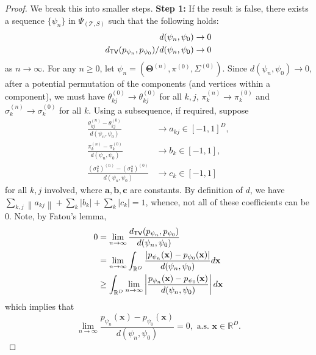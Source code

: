 \documentclass[bj,authoryear]{imsart}
\theoremstyle{plain}
\theoremstyle{remark}
\def\bTheta{{\boldsymbol\Theta}}
\def\ba{\mathbf{a}}
\def\bb{\mathbf{b}}
\def\bc{\mathbf{c}}
\def\bx{\mathbf{x}}
\def\bbR{\mathbb{R}}
\def\cT{\mathcal{T}}
\def\norm#1{\left\|#1\right\|}
\def\TV{{\sf TV}}
\def\bTheta{\boldsymbol{\Theta}}
\begin{document}
\begin{appendix}
\begin{proof}
We break this into smaller steps.
\textbf{Step 1: } If the result is false, there exists a sequence $\{\psi_n\}$ in $\Psi_{(\cT,S)}$ such that the following holds:
\begin{align}
    d(\psi_n,\psi_0)&\to 0 \\
    d_{\TV}(p_{\psi_n}, p_{\psi_0})/d(\psi_n,\psi_0) &\to 0
\end{align}
as $n\to\infty$. For any $n\geq 0$, let $\psi_n = (\bTheta^{(n)}, \pi^{(0)}, \Sigma^{(0)})$. Since $d(\psi_n,\psi_0)\to 0$, after a potential permutation of the components (and vertices within a component), we must have $\theta_{kj}^{(0)}\to\theta_{kj}^{(0)}$ for all $k,j$, $\pi_k^{(n)}\to\pi_k^{(0)}$ and $\sigma_k^{(n)}\to\sigma_k^{(0)}$ for all $k$. Using a subsequence, if required, suppose
\begin{align}
    \frac{\theta_{kj}^{(n)}-\theta_{kj}^{(0)}}{d(\psi_n,\psi_0)} &\to a_{kj} \in [-1,1]^D,\\
    \frac{\pi_{k}^{(n)}-\pi_{k}^{(0)}}{d(\psi_n,\psi_0)} &\to b_{k} \in [-1,1],\\
    \frac{(\sigma_{k}^2)^{(n)}-(\sigma_{k}^2)^{(0)}}{d(\psi_n,\psi_0)} &\to c_{k} \in [-1,1]
\end{align}
for all $k,j$ involved, where $\ba, \bb, \bc$ are constants. By definition of $d$, we have $\sum_{k,j}\norm{a_{kj}} + \sum_k |b_k| + \sum_k |c_k| = 1$, whence, not all of these coefficients can be 0. Note, by Fatou's lemma,
\begin{align*}
    0 &= \lim_{n\to \infty} \frac{d_{\TV}(p_{\psi_n},p_{\psi_0})}{d(\psi_n, \psi_0)} \\
    &= \lim_{n\to\infty} \int_{\bbR^D} \frac{\left|p_{\psi_n}(\bx) - p_{\psi_0}(\bx)\right|}{d(\psi_n,\psi_0)} d\bx \\
    &\geq \int_{\bbR^D} \lim_{n\to\infty} \left|\frac{p_{\psi_n}(\bx)-p_{\psi_0}(\bx)}{d(\psi_n,\psi_0)}\right| d\bx
\end{align*}
which implies that
\begin{equation}\label{eq:inv_proof1}
    \lim_{n\to\infty} \frac{p_{\psi_n}(\bx)-p_{\psi_0}(\bx)}{d(\psi_n,\psi_0)} = 0, \text{ a.s. } \bx\in\bbR^D.
\end{equation}


\end{proof}
\end{appendix}
\end{document}

